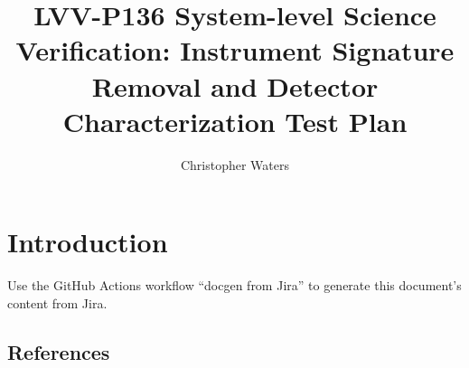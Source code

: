 \documentclass[DM,lsstdraft,toc]{lsstdoc}
\begin{document}
\def\milestoneName{System-level Science Verification: Instrument Signature Removal and Detector Characterization}
\def\milestoneId{LVV-P136}
\def\product{Data Management}


\title{LVV-P136 System-level Science Verification: Instrument Signature Removal and Detector Characterization Test Plan }
\setDocRef{\lsstDocType-\lsstDocNum}
\date{\vcsDate}
\author{Christopher Waters}




\maketitle

\section{Introduction}
Use the GitHub Actions workflow ``docgen from Jira'' to generate this document's content from Jira.

\subsection{References}
\label{sect:references}
\renewcommand{\refname}{}




\end{document}
